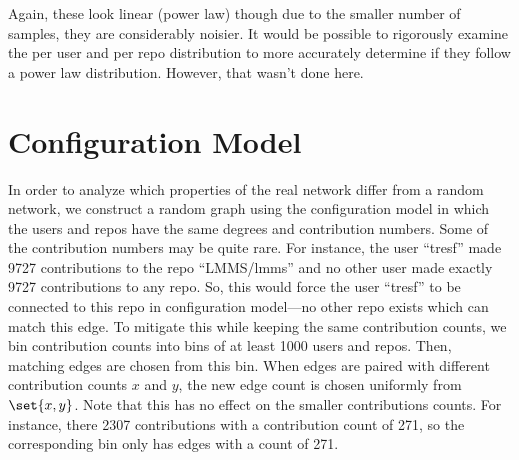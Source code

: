 \documentclass{pset}
\begin{document}

Again, these look linear (power law) though due to the smaller number of samples,
they are considerably noisier. It would be possible to rigorously examine
the per user and per repo distribution to more accurately determine if they
follow a power law distribution. However, that wasn't done here.

\section*{Configuration Model}

In order to analyze which properties of the real network differ from a random network,
we construct a random graph using the configuration model in which the users
and repos have the same degrees and contribution numbers.
Some of the contribution numbers may be quite rare. For instance, the
user ``tresf'' made 9727 contributions to the repo ``LMMS/lmms'' and no other
user made exactly 9727 contributions to any repo.
So, this would force the user ``tresf'' to be connected to this repo in
configuration model---no other repo exists which can match this edge.
To mitigate this while keeping the same contribution counts, we
bin contribution counts into bins of at least 1000 users and repos.
Then, matching edges are chosen from this bin.
When edges are paired with different contribution counts $x$ and $y$, the new edge
count is chosen uniformly from $\set{x, y}$.
Note that this has no effect on the smaller contributions counts.
For instance, there 2307 contributions with a contribution count of 271,
so the corresponding bin only has edges with a count of 271.
\end{document}
